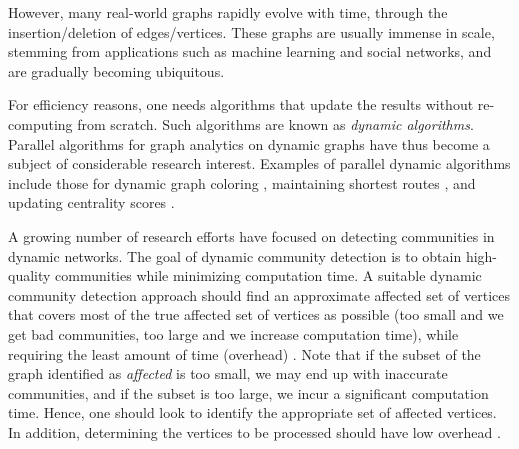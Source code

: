 However, many real-world graphs rapidly evolve with time, through the insertion/deletion of edges/vertices. These graphs are usually immense in scale, stemming from applications such as machine learning and social networks, and are gradually becoming ubiquitous. For efficiency reasons, one needs algorithms that update the results without re-computing from scratch. Such algorithms are known as \textit{dynamic algorithms}. Parallel algorithms for graph analytics on dynamic graphs have thus become a subject of considerable research interest. Examples of parallel dynamic algorithms include those for dynamic graph coloring \cite{color-yuan17, color-bhattacharya18}, maintaining shortest routes \cite{path-zhang17, path-khanda21}, and updating centrality scores \cite{cent-shao20, cent-regunta21}.

A growing number of research efforts have focused on detecting communities in dynamic networks. The goal of dynamic community detection is to obtain high-quality communities while minimizing computation time. A suitable dynamic community detection approach should find an approximate affected set of vertices that covers most of the true affected set of vertices as possible (too small and we get bad communities, too large and we increase computation time), while requiring the least amount of time (overhead) \cite{incr-ramalingam96}. Note that if the subset of the graph identified as \textit{affected} is too small, we may end up with inaccurate communities, and if the subset is too large, we incur a significant computation time. Hence, one should look to identify the appropriate set of affected vertices. In addition, determining the vertices to be processed should have low overhead \cite{incr-ramalingam96}.


